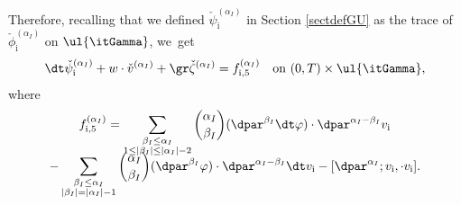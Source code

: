 Therefore, recalling that we defined $\check\psi_\mathrm{i}^{(\alpha_I)}$ in Section \ref{sectdefGU} as the trace of
$\check{\phi}_\mathrm{i}^{(\alpha_I)}$ on $\ul{\itGamma}$, we~get
\begin{equation}\label{QLBC00}
\dt\check{\psi}_\mathrm{i}^{(\alpha_I)} + w\cdot\check{v}^{(\alpha_I)} + \gr\check{\zeta}^{(\alpha_I)} =f_{{\rm i},5}^{(\alpha_I)}
\quad\text{on } (0,T)\times\ul{\itGamma},
\end{equation}
where
\begin{multline*}
f_{{\rm i},5}^{(\alpha_I)}
= \sum_{\substack{\beta_I\leq\alpha_I\\ 1\leq|\beta_I|\leq|\alpha_I|-2}} \binom{\alpha_I}{\beta_I} (\dpar^{\beta_I}\dt\varphi)\cdot\dpar^{\alpha_I-\beta_I}v_\mathrm{i} \\[-8pt]
- \sum_{\substack{\beta_I\leq\alpha_I\\ |\beta_I|=|\alpha_I|-1}} \binom{\alpha_I}{\beta_I}(\dpar^{\beta_I}\varphi)\cdot\dpar^{\alpha_I-\beta_I}\dt v_\mathrm{i}
- [\dpar^{\alpha_I};v_\mathrm{i},\cdot v_\mathrm{i}].
\end{multline*}

